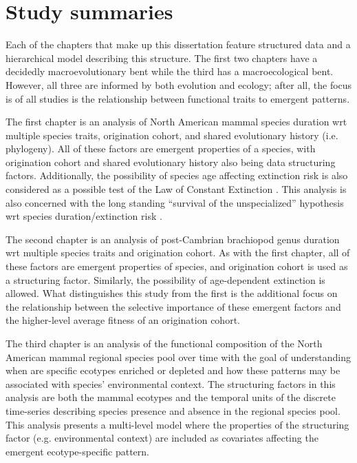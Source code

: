 \section{Study summaries}  %

Each of the chapters that make up this dissertation feature structured data and a hierarchical model describing this structure. The first two chapters have a decidedly macroevolutionary bent while the third has a macroecological bent. However, all three are informed by both evolution and ecology; after all, the focus is of all studies is the relationship between functional traits to emergent patterns.




The first chapter is an analysis of North American mammal species duration wrt multiple species traits, origination cohort, and shared evolutionary history (i.e. phylogeny). All of these factors are emergent properties of a species, with origination cohort and shared evolutionary history also being data structuring factors. Additionally, the possibility of species age affecting extinction risk is also considered as a possible test of the Law of Constant Extinction \citep{VanValen1973}. This analysis is also concerned with the long standing ``survival of the unspecialized'' hypothesis wrt species duration/extinction risk \citep{Simpson1944}.

The second chapter is an analysis of post-Cambrian brachiopod genus duration wrt multiple species traits and origination cohort. As with the first chapter, all of these factors are emergent properties of species, and origination cohort is used as a structuring factor. Similarly, the possibility of age-dependent extinction is allowed. What distinguishes this study from the first is the additional focus on the relationship between the selective importance of these emergent factors and the higher-level average fitness of an origination cohort.

The third chapter is an analysis of the functional composition of the North American mammal regional species pool over time with the goal of understanding when are specific ecotypes enriched or depleted and how these patterns may be associated with species' environmental context. The structuring factors in this analysis are both the mammal ecotypes and the temporal units of the discrete time-series describing species presence and absence in the regional species pool. This analysis presents a multi-level model where the properties of the structuring factor (e.g. environmental context) are included as covariates affecting the emergent ecotype-specific pattern. 



